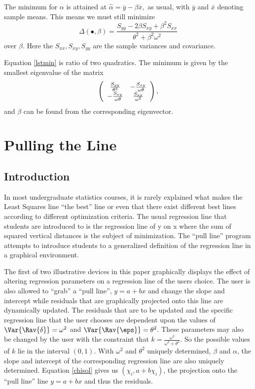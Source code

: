 \documentclass[11pt]{report}
\begin{document}
The minimum for $\alpha$ is attained at $\hat\alpha=\overline y-\beta\overline x,$ as usual,
with $\overline y$ and $\overline x$ denoting sample means. This means we must still minimize
\begin{equation}\label{lstmin}
\Delta(\bullet,\beta)=
\frac{S_{yy}-2\beta S_{xy}+\beta^2S_{xx}}{\theta^2+\beta^2\omega^2}
\end{equation}
over $\beta.$ Here the $S_{xx}, S_{xy}, S_{yy}$ are the sample variances
and covariance. 

Equation \ref{lstmin} is ratio of two quadratics. The minimum is
given by the smallest eigenvalue of the matrix
\begin{equation}\label{matje}
\begin{array}({cc})
\frac{S_{yy}}{\theta^2}&-\frac{S_{xy}}{\omega\theta}\\
-\frac{S_{xy}}{\omega\theta}&\frac{S_{xx}}{\omega^2}
\end{array},
\end{equation} 
and $\beta$ can be found from the corresponding eigenvector.

\chapter{Pulling the Line}
\section{Introduction}
   In most undergraduate statistics courses, it is rarely explained what makes
the Least Squares line ``the best'' line or even that there exist different
best lines according to different optimization criteria.  The usual regression
line that students are introduced to is the regression line of y on x where
the sum of squared vertical distances is the subject of minimization. 
The ``pull line'' program attempts to introduce students to a generalized
definition of the regression line in a graphical environment.

    The first of two illustrative devices in this paper graphically displays 
the effect of altering regression parameters on a regression line of the 
users choice.  The user is also allowed
to ``grab'' a ``pull line'', $y = a + bx$ and change the slope and intercept 
while residuals that are graphically projected onto this line are dynamically 
updated.  
  The residuals that are to be updated and the specific regression line
that the user chooses are dependent upon the values of 
$\Var{\Rav{\delta}}=\omega^2$ and 
$\Var{\Rav{\eps}} =\theta^2$. These parameters may also be changed by the user
with the constraint that $k = \frac{\omega^2}{\omega^2 + \theta^2}$.  So
the possible values of $k$ lie in the interval $(0, 1).$
With $\omega^2$ and $\theta^2$ uniquely determined, $\beta$ and $\alpha$, 
the slope and intercept of the corresponding regression line are also
uniquely determined.  
Equation \ref{chisol} gives us $(\chi_i,  a + b \chi_i)$, the projection onto 
the ``pull line'' line $y = a + bx$ and thus the residuals. 
\end{document}

